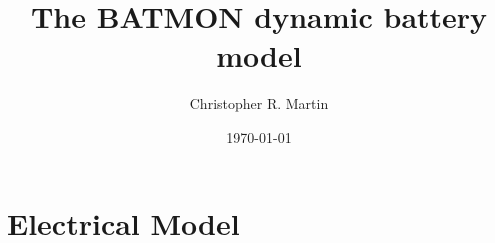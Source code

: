 \documentclass{article}
\title{The BATMON dynamic battery model}
\author{Christopher R. Martin}
\date{\today}
\begin{document}
\maketitle

\section{Electrical Model}
\end{document}
